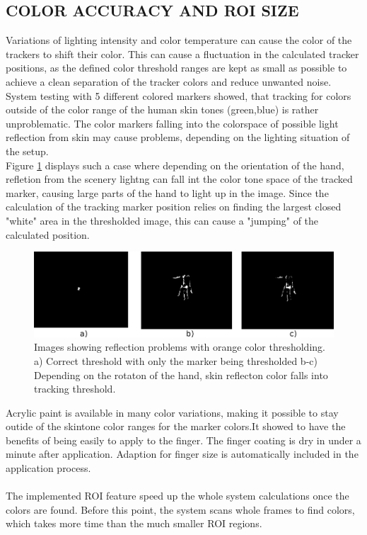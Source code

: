 \subsection{COLOR ACCURACY AND ROI SIZE}
Variations of lighting intensity and color temperature  can cause the color of the trackers to shift their color. This can cause a fluctuation in the calculated tracker positions, as the defined color threshold ranges are kept as small as possible to achieve a clean separation of the tracker colors and reduce unwanted noise. \\
System testing with 5 different colored markers showed, that tracking for colors outside of the color range of the human skin tones (green,blue) is rather unproblematic. The color markers falling into the colorspace of possible light reflection from skin may cause problems, depending on the lighting situation of the setup.
\\Figure \ref{img:Color_reflecton_problems} displays such a case where depending on the orientation of the hand, refletion from the scenery lightng can fall int the color tone space of the tracked marker, causing large parts of the hand to light up in the image. Since the calculation of the tracking marker position relies on finding the largest closed "white" area in the thresholded image, this can cause a "jumping" of the calculated position.
\begin{figure}[b]
\includegraphics[width=\columnwidth]{images/color_tracking_probs.png}
\caption{Images showing reflection problems with  orange color thresholding. a) Correct threshold with only the marker being thresholded b-c) Depending on the rotaton of the hand, skin reflecton color falls into tracking threshold.}
\label{img:Color_reflecton_problems} 
\end{figure}
Acrylic paint is available in many color variations, making it possible to stay outide of the skintone color ranges for the marker colors.It showed to have the benefits of being easily to apply to the finger. The finger coating is dry in under a minute after application. Adaption for finger size is automatically included in the application process.  
\\\\The implemented ROI feature speed up the whole system calculations once the colors are found. Before this point, the system scans whole frames to find colors, which takes more time than the much smaller ROI regions.
